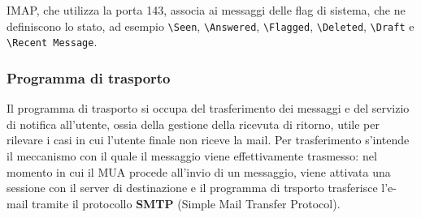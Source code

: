 \documentclass[a4paper,11pt]{article}
\def\code#1{\texttt{#1}}
\def\subsub#1{\subsubsection{#1}\label{#1}}
\begin{document}
IMAP, che utilizza la porta 143, associa ai messaggi delle flag di sistema, che ne definiscono lo stato, ad esempio \code{\textbackslash Seen}, \code{\textbackslash Answered}, \code{\textbackslash Flagged}, \code{\textbackslash Deleted}, \code{\textbackslash Draft} e \code{\textbackslash Recent Message}.\\
\subsub{Programma di trasporto} Il programma di trasporto si occupa del trasferimento dei messaggi e del servizio di notifica all'utente, ossia della gestione della ricevuta di ritorno, utile per rilevare i casi in cui l'utente finale non riceve la mail.\newline
Per trasferimento s'intende il meccanismo con il quale il messaggio viene effettivamente trasmesso: nel momento in cui il MUA procede all'invio di un messaggio, viene attivata una sessione con il server di destinazione e il programma di trsporto trasferisce l'e-mail tramite il protocollo \textbf{SMTP} (Simple Mail Transfer Protocol). 
\end{document}
